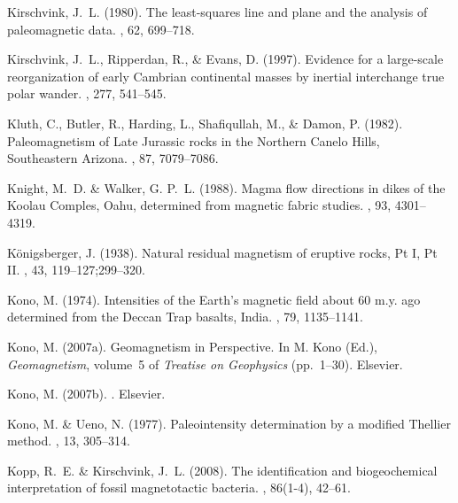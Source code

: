 Kirschvink, J.~L. (1980).
\newblock The least-squares line and plane and the analysis of paleomagnetic
  data.
, 62, 699--718.

Kirschvink, J.~L., Ripperdan, R., \& Evans, D. (1997).
\newblock Evidence for a large-scale reorganization of early Cambrian
  continental masses by inertial interchange true polar wander.
, 277, 541--545.

Kluth, C., Butler, R., Harding, L., Shafiqullah, M., \& Damon, P. (1982).
\newblock Paleomagnetism of Late Jurassic rocks in the Northern Canelo Hills,
  Southeastern Arizona.
, 87, 7079--7086.

Knight, M.~D. \& Walker, G. P.~L. (1988).
\newblock Magma flow directions in dikes of the Koolau Comples, Oahu,
  determined from magnetic fabric studies.
, 93, 4301--4319.

K\"onigsberger, J. (1938).
\newblock Natural residual magnetism of eruptive rocks, Pt I, Pt II.
, 43, 119--127;299--320.

Kono, M. (1974).
\newblock Intensities of the Earth's magnetic field about 60 m.y. ago
  determined from the Deccan Trap basalts, India.
, 79, 1135--1141.

Kono, M. (2007a).
\newblock Geomagnetism in Perspective.
\newblock In M. Kono (Ed.), {\em Geomagnetism}, volume~5 of {\em Treatise on
  Geophysics}  (pp.\ 1--30). Elsevier.

Kono, M. (2007b).
.
\newblock Elsevier.

Kono, M. \& Ueno, N. (1977).
\newblock Paleointensity determination by a modified Thellier method.
, 13, 305--314.

Kopp, R.~E. \& Kirschvink, J.~L. (2008).
\newblock The identification and biogeochemical interpretation of fossil
  magnetotactic bacteria.
, 86(1-4), 42--61.

